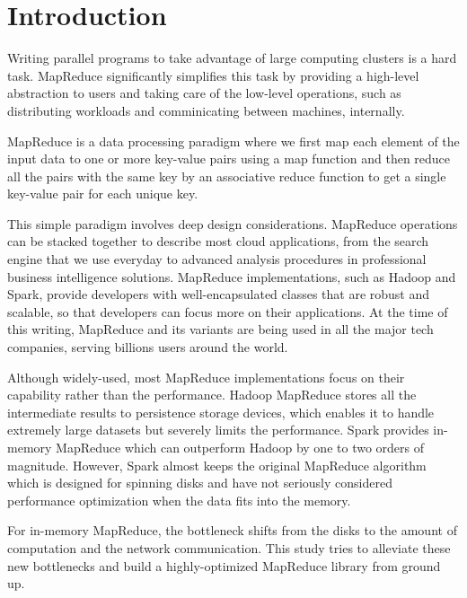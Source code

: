 \documentclass{sigkddExp}
\begin{document}
\begin{abstract}
\end{abstract}

\section{Introduction}
\cite{dean2008mapreduce,chambers2010flumejava,dean2010mapreduce,zaharia2010spark,zaharia2016apache,davidson2013optimizing,xin2013graphx,meng2016mllib,shanahan2015large,ene2011fast}
Writing parallel programs to take advantage of large computing clusters is a hard task.
MapReduce significantly simplifies this task by providing a high-level abstraction to users and taking care of the low-level operations, such as distributing workloads and comminicating between machines, internally.


MapReduce is a data processing paradigm where we first map each element of the input data to one or more key-value pairs using a map function and then reduce all the pairs with the same key by an associative reduce function to get a single key-value pair for each unique key.

This simple paradigm involves deep design considerations. MapReduce operations can be stacked together to describe most cloud applications, from the search engine that we use everyday to advanced analysis procedures in professional business intelligence solutions. MapReduce implementations, such as Hadoop and Spark, provide developers with well-encapsulated classes that are robust and scalable, so that developers can focus more on their applications. At the time of this writing, MapReduce and its variants are being used in all the major tech companies, serving billions users around the world.

Although widely-used, most MapReduce implementations focus on their capability rather than the performance. Hadoop MapReduce stores all the intermediate results to persistence storage devices, which enables it to handle extremely large datasets but severely limits the performance. Spark provides in-memory MapReduce which can outperform Hadoop by one to two orders of magnitude. However, Spark almost keeps the original MapReduce algorithm which is designed for spinning disks and have not seriously considered performance optimization when the data fits into the memory.

For in-memory MapReduce, the bottleneck shifts from the disks to the amount of computation and the network communication. This study tries to alleviate these new bottlenecks and build a highly-optimized MapReduce library from ground up.
\end{document}
